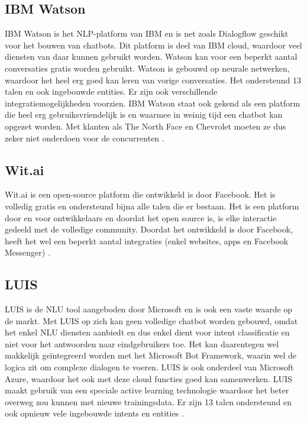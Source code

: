 \subsection{IBM Watson}
\label{subsec:nlp-platformen-ibm-watson}

IBM Watson is het NLP-platform van IBM en is net zoals Dialogflow geschikt voor het bouwen van chatbots. Dit platform is deel van IBM cloud, waardoor veel diensten van daar kunnen gebruikt worden. Watson kan voor een beperkt aantal conversaties gratis worden gebruikt. Watson is gebouwd op neurale netwerken, waardoor het heel erg goed kan leren van vorige conversaties. Het ondersteund 13 talen en ook ingebouwde entities. Er zijn ook verschillende integratiemogelijkheden voorzien. IBM Watson staat ook gekend als een platform die heel erg gebruiksvriendelijk is en waarmee in weinig tijd een chatbot kan opgezet worden. Met klanten als The North Face en Chevrolet moeten ze dus zeker niet onderdoen voor de concurrenten \autocite{IBM2020}.


\subsection{Wit.ai}
\label{subsec:nlp-platformen-wit.ai}

Wit.ai is een open-source platform die ontwikkeld is door Facebook. Het is volledig gratis en ondersteund bijna alle talen die er bestaan. Het is een platform door en voor ontwikkelaars en doordat het open source is, is elke interactie gedeeld met de volledige community. Doordat het ontwikkeld is door Facebook, heeft het wel een beperkt aantal integraties (enkel websites, apps en Facebook Messenger) \autocite{Wit2020}.

\subsection{LUIS}
\label{subsec:nlp-platformen-luis} 

LUIS is de NLU tool aangeboden door Microsoft en is ook een vaste waarde op de markt. Met LUIS op zich kan geen volledige chatbot worden gebouwd, omdat het enkel NLU diensten aanbiedt en dus enkel dient voor intent classificatie en niet voor het antwoorden naar eindgebruikers toe.  Het kan daarentegen wel makkelijk geïntegreerd worden met het Microsoft Bot Framework, waarin wel de logica zit om complexe dialogen te voeren. LUIS is ook onderdeel van Microsoft Azure, waardoor het ook met deze cloud functies goed kan samenwerken. LUIS maakt gebruik van een speciale active learning technologie waardoor het beter overweg zou kunnen met nieuwe trainingsdata. Er zijn 13 talen ondersteund en ook opnieuw vele ingebouwde intents en entities \autocite{LUIS2020}.

